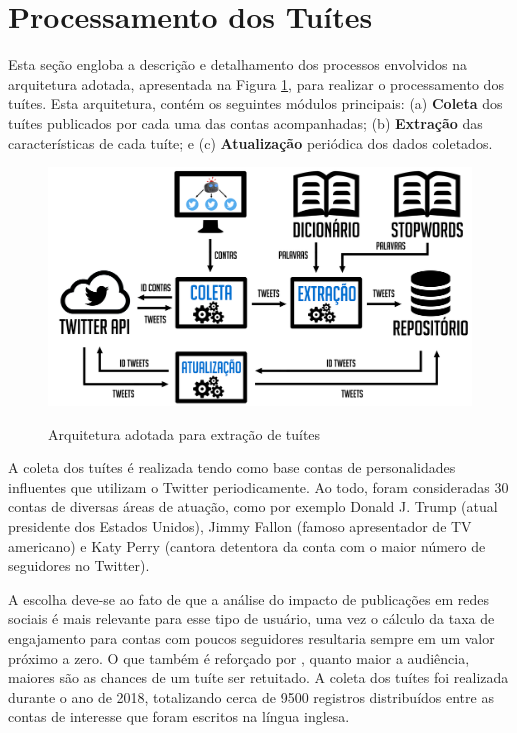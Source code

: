 \documentclass[oneside,openright,12pt]{ufsm_2015} %
\begin{document}
\section{Processamento dos Tuítes}

    \par Esta seção engloba a descrição e detalhamento dos processos envolvidos na arquitetura adotada, apresentada na Figura \ref{fig:arquitetura}, para realizar o processamento dos tuítes. Esta arquitetura, contém os seguintes módulos principais: (a) \textbf{Coleta} dos tuítes publicados por cada uma das contas acompanhadas; (b) \textbf{Extração} das características de cada tuíte; e (c) \textbf{Atualização} periódica dos dados coletados.
    
    \begin{figure}[ht]
        \caption{Arquitetura adotada para extração de tuítes}
        \centering
        \includegraphics[width=1\textwidth]{figuras/arquitetura.png}
        \vspace{\baselineskip} %
        \label{fig:arquitetura}
    \end{figure}
    
    \par A coleta dos tuítes é realizada tendo como base contas de personalidades influentes que utilizam o Twitter periodicamente. Ao todo, foram consideradas 30 contas de diversas áreas de atuação, como por exemplo Donald J. Trump (atual presidente dos Estados Unidos), Jimmy Fallon (famoso apresentador de TV americano) e Katy Perry (cantora detentora da conta com o maior número de seguidores no Twitter).
    
    \par A escolha deve-se ao fato de que a análise do impacto de publicações em redes sociais é mais relevante para esse tipo de usuário, uma vez o cálculo da taxa de engajamento para contas com poucos seguidores resultaria sempre em um valor próximo a zero. O que também é reforçado por \cite{ieee:suh:10}, quanto maior a audiência, maiores são as chances de um tuíte ser retuitado. A coleta dos tuítes foi realizada durante o ano de 2018, totalizando cerca de 9500 registros distribuídos entre as contas de interesse que foram escritos na língua inglesa.
\end{document}
